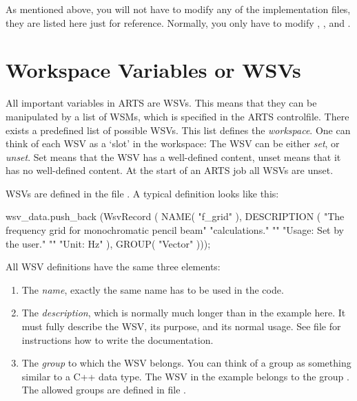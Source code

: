 \vspace{2ex} As mentioned above, you will not have to modify any of
the implementation files, they are listed here just for reference.
Normally, you only have to modify ,
, and .

\section{Workspace Variables or WSVs}
\label{sec:agendas:wsvs}

All important variables in ARTS are WSVs. This means that they can be
manipulated by a list of WSMs, which is specified in the ARTS
controlfile. There exists a predefined list of possible WSVs. This
list defines the \emph{workspace}. One can think of each WSV as a
`slot' in the workspace: The WSV can be either \emph{set}, or
\emph{unset}. Set means that the WSV has a well-defined content, unset
means that it has no well-defined content. At the start of an ARTS job
all WSVs are unset.

WSVs are defined in the file . A typical
definition looks like this:

\begin{code}
wsv_data.push_back
  (WsvRecord
   ( NAME( "f_grid" ),
     DESCRIPTION
     (
      "The frequency grid for monochromatic pencil beam\n"
      "calculations.\n"
      "\n"
      "Usage:      Set by the user.\n"
      "\n"
      "Unit:       Hz"
      ),
     GROUP( "Vector" )));
\end{code}

\noindent
All WSV definitions have the same three elements:
\begin{enumerate}
\item The \emph{name}, exactly the
  same name has to be used in the code.
\item The \emph{description}, which is normally much longer than in
  the example here. It must fully describe the WSV, its purpose, and
  its normal usage. See file  for instructions
  how to write the documentation.
\item The \emph{group} to which the WSV belongs. You can think of a
  group as something similar to a C++ data type. The WSV in the
  example belongs to the group . The allowed groups
  are defined in file .
\end{enumerate}

